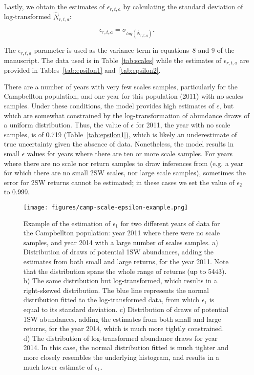 \documentclass[12pt]{article}
\begin{document}
Lastly, we obtain the estimates of $\epsilon_{r,t,a}$ by calculating the standard deviation of log-transformed $\hat{N}_{r,t,a}$:

\begin{equation}
\epsilon_{r,t,a} = \sigma_{log(\hat{N}_{r,t,a})}.
\end{equation}

The $\epsilon_{r,t,a}$ parameter is used as the variance term in equations~8 and 9 of the manuscript.
The data used is in Table~\ref{tab:scales} while the estimates of $\epsilon_{r,t,a}$ are provided in Tables~\ref{tab:epsilon1} and~\ref{tab:epsilon2}.

There are a number of years with very few scales samples, particularly for the
Campbellton population, and one year for this population (2011) with no scales
samples. Under these conditions, the model provides high estimates of
$\epsilon$, but which are somewhat constrained by the log-transformation of
abundance draws of a uniform distribution. Thus, the value of $\epsilon$ for
2011, the year with no scale samples, is of 0.719 (Table~\ref{tab:epsilon1}),
which is likely an underestimate of true uncertainty given the absence of
data. Nonetheless, the model results in small $\epsilon$ values for years
where there are ten or more scale samples.
For years where there are no scale nor return samples to draw inferences from (e.g. a year for which there are no small 2SW scales, nor large scale samples),
sometimes the error for 2SW returns cannot be estimated; in these cases we set the value of $\epsilon_{2}$ to 0.999.

\begin{figure}[htbp] \centering
    \texttt{[image: figures/camp-scale-epsilon-example.png]} \caption{Example
        of the estimation of $\epsilon_{1}$ for two different years of data for the Campbellton population: year 2011 where
        there were no scale samples, and year 2014 with a large number of scales samples. a) Distribution of draws of potential
    1SW abundances, adding the estimates from both small and large returns, for the year 2011. Note that the distribution spans the whole range of
returns (up to 5443). b) The same distribution but log-transformed, which results in a right-skewed distribution. The blue line represents the normal
distribution fitted to the log-transformed data, from which $\epsilon_{1}$ is equal to its standard deviation. c) Distribution of draws of potential
    1SW abundances, adding the estimates from both small and large returns, for the year 2014, which is much more tightly constrained. d) The distribution
of log-transformed abundance draws for year 2014. In this case, the normal distribution fitted is much tighter and more closely resembles the underlying histogram,
and results in a much lower estimate of $\epsilon_{1}$.}
    \label{fig:priors}
\end{figure}
\end{document}
